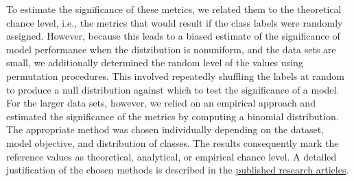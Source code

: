 \noindent To estimate the significance of these metrics, we related them to the theoretical chance level, i.e., the metrics that would result if the class labels were randomly assigned. However, because this leads to a biased estimate of the significance of model performance when the distribution is nonuniform, and the data sets are small, we additionally determined the random level of the values using permutation procedures. This involved repeatedly shuffling the labels at random to produce a null distribution against which to test the significance of a model. For the larger data sets, however, we relied on an empirical approach and estimated the significance of the metrics by computing a binomial distribution. The appropriate method was chosen individually depending on the dataset, model objective, and distribution of classes. The results consequently mark the reference values as theoretical, analytical, or empirical chance level. A detailed justification of the chosen methods is described in the \hyperref[pub:papers]{published research articles}.

